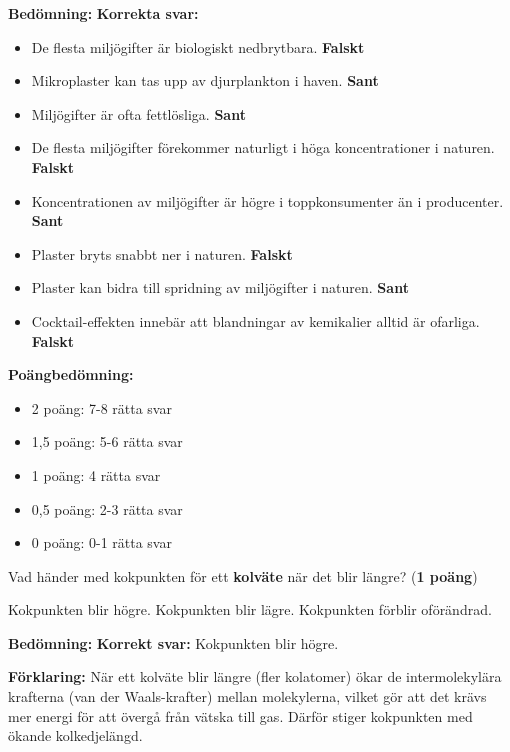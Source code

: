 \documentclass[12pt]{exam}
\newenvironment{answer}
  {\begin{framed}\color{blue}\textbf{Bedömning:} }
  {\end{framed}}
\begin{document}
\begin{questions}
\begin{answer}
\textbf{Korrekta svar:}
\begin{itemize}
  \item De flesta miljögifter är biologiskt nedbrytbara. \textbf{Falskt}
  \item Mikroplaster kan tas upp av djurplankton i haven. \textbf{Sant}
  \item Miljögifter är ofta fettlösliga. \textbf{Sant}
  \item De flesta miljögifter förekommer naturligt i höga koncentrationer i naturen. \textbf{Falskt}
  \item Koncentrationen av miljögifter är högre i toppkonsumenter än i producenter. \textbf{Sant}
  \item Plaster bryts snabbt ner i naturen. \textbf{Falskt}
  \item Plaster kan bidra till spridning av miljögifter i naturen. \textbf{Sant}
  \item Cocktail-effekten innebär att blandningar av kemikalier alltid är ofarliga. \textbf{Falskt}
\end{itemize}

\textbf{Poängbedömning:}
\begin{itemize}
  \item 2 poäng: 7-8 rätta svar
  \item 1,5 poäng: 5-6 rätta svar
  \item 1 poäng: 4 rätta svar
  \item 0,5 poäng: 2-3 rätta svar
  \item 0 poäng: 0-1 rätta svar
\end{itemize}
\end{answer}
\vspace{5mm}

\question Vad händer med kokpunkten för ett \textbf{kolväte} när det blir längre? (\textbf{1 poäng})
\begin{checkboxes}
  \choice \textcolor{blue}{\checkmark} Kokpunkten blir högre.
  \choice Kokpunkten blir lägre.
  \choice Kokpunkten förblir oförändrad.
\end{checkboxes}
\vspace{5mm}  

\begin{answer}
\textbf{Korrekt svar:} Kokpunkten blir högre.

\textbf{Förklaring:} När ett kolväte blir längre (fler kolatomer) ökar de intermolekylära krafterna (van der Waals-krafter) mellan molekylerna, vilket gör att det krävs mer energi för att övergå från vätska till gas. Därför stiger kokpunkten med ökande kolkedjelängd.


\end{answer}
\end{questions}
\end{document}
